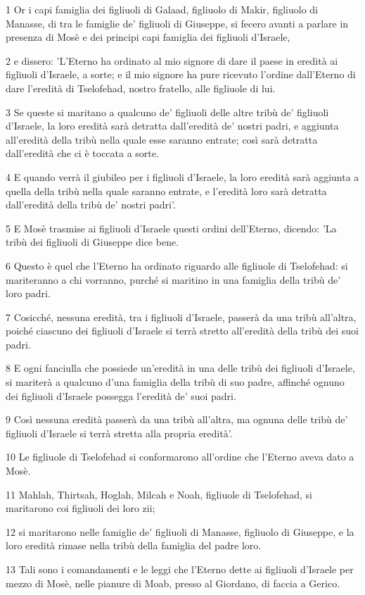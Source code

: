 \par 1 Or i capi famiglia dei figliuoli di Galaad, figliuolo di Makir, figliuolo di Manasse, di tra le famiglie de' figliuoli di Giuseppe, si fecero avanti a parlare in presenza di Mosè e dei principi capi famiglia dei figliuoli d'Israele,
\par 2 e dissero: 'L'Eterno ha ordinato al mio signore di dare il paese in eredità ai figliuoli d'Israele, a sorte; e il mio signore ha pure ricevuto l'ordine dall'Eterno di dare l'eredità di Tselofehad, nostro fratello, alle figliuole di lui.
\par 3 Se queste si maritano a qualcuno de' figliuoli delle altre tribù de' figliuoli d'Israele, la loro eredità sarà detratta dall'eredità de' nostri padri, e aggiunta all'eredità della tribù nella quale esse saranno entrate; così sarà detratta dall'eredità che ci è toccata a sorte.
\par 4 E quando verrà il giubileo per i figliuoli d'Israele, la loro eredità sarà aggiunta a quella della tribù nella quale saranno entrate, e l'eredità loro sarà detratta dall'eredità della tribù de' nostri padri'.
\par 5 E Mosè trasmise ai figliuoli d'Israele questi ordini dell'Eterno, dicendo: 'La tribù dei figliuoli di Giuseppe dice bene.
\par 6 Questo è quel che l'Eterno ha ordinato riguardo alle figliuole di Tselofehad: si mariteranno a chi vorranno, purché si maritino in una famiglia della tribù de' loro padri.
\par 7 Cosicché, nessuna eredità, tra i figliuoli d'Israele, passerà da una tribù all'altra, poiché ciascuno dei figliuoli d'Israele si terrà stretto all'eredità della tribù dei suoi padri.
\par 8 E ogni fanciulla che possiede un'eredità in una delle tribù dei figliuoli d'Israele, si mariterà a qualcuno d'una famiglia della tribù di suo padre, affinché ognuno dei figliuoli d'Israele possegga l'eredità de' suoi padri.
\par 9 Così nessuna eredità passerà da una tribù all'altra, ma ognuna delle tribù de' figliuoli d'Israele si terrà stretta alla propria eredità'.
\par 10 Le figliuole di Tselofehad si conformarono all'ordine che l'Eterno aveva dato a Mosè.
\par 11 Mahlah, Thirtsah, Hoglah, Milcah e Noah, figliuole di Tselofehad, si maritarono coi figliuoli dei loro zii;
\par 12 si maritarono nelle famiglie de' figliuoli di Manasse, figliuolo di Giuseppe, e la loro eredità rimase nella tribù della famiglia del padre loro.
\par 13 Tali sono i comandamenti e le leggi che l'Eterno dette ai figliuoli d'Israele per mezzo di Mosè, nelle pianure di Moab, presso al Giordano, di faccia a Gerico.


